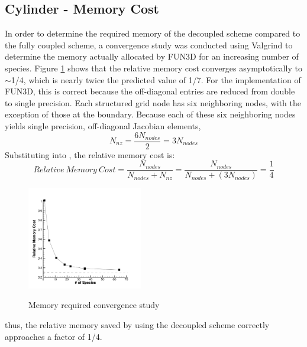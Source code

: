 
\subsection{Cylinder - Memory Cost}

In order to determine the required memory of the decoupled scheme compared
to the fully coupled scheme, a convergence study was conducted using
Valgrind\cite{valgrind} to determine the memory actually allocated by FUN3D for
an increasing number of species.  
Figure \ref{mem_req} shows that the relative memory cost converges asymptotically to
$\sim$1/4, which is nearly twice the predicted value of 1/7.  For the
implementation of FUN3D, this is correct because the off-diagonal entries are
reduced from double to single precision.  Each structured grid node has six
neighboring nodes, with the exception of those at the boundary.  Because each of
these six neighboring nodes yields single precision, off-diagonal Jacobian
elements, 
\begin{equation} 
  N_{nz} = \frac{6N_{nodes}}{2} = 3N_{nodes}
  \label{f3d_off_diag} 
\end{equation} 
Substituting  into , the relative memory
cost is:
\begin{equation} 
  Relative\ Memory\ Cost = 
  \frac{N_{nodes}}{N_{nodes} + N_{nz}} =
  \frac{N_{nodes}}{N_{nodes} + (3N_{nodes})}=\frac{1}{4}
\end{equation}
\begin{figure}[h] 
  \begin{center} 
    \includegraphics[width=0.45\textwidth]{figures/scitech/mem_req}
    \caption{Memory required convergence study} 
    \vspace{-2em}
    \label{mem_req}
    \end{center} 
\end{figure}
thus, the relative memory saved by using the decoupled scheme correctly
approaches a factor of 1/4.

